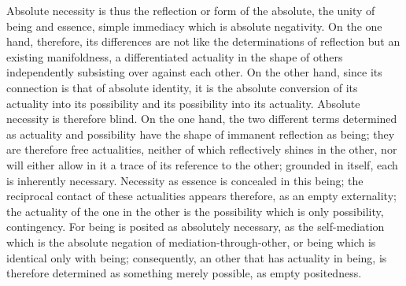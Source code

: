 Absolute necessity is thus the reflection or form of
the absolute, the unity of being and essence,
simple immediacy which is absolute negativity.
On the one hand, therefore, its differences are not like
the determinations of reflection but an existing manifoldness,
a differentiated actuality in the shape of others
independently subsisting over against each other.
On the other hand, since its connection is
that of absolute identity,
it is the absolute conversion of
its actuality into its possibility
and its possibility into its actuality.
Absolute necessity is therefore blind.
On the one hand, the two different terms
determined as actuality and possibility have
the shape of immanent reflection as being;
they are therefore free actualities,
neither of which reflectively shines in the other,
nor will either allow in it a trace of its reference to the other;
grounded in itself, each is inherently necessary.
Necessity as essence is concealed in this being;
the reciprocal contact of these actualities appears
therefore, as an empty externality;
the actuality of the one in the other is
the possibility which is only possibility, contingency.
For being is posited as absolutely necessary,
as the self-mediation which is the absolute negation of
mediation-through-other,
or being which is identical only with being;
consequently, an other that has actuality in being,
is therefore determined as something merely possible,
as empty positedness.

